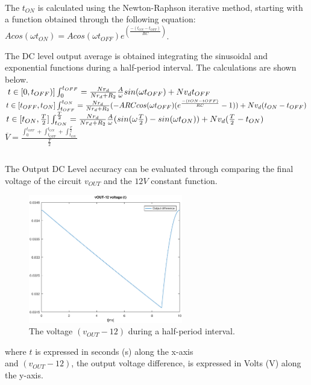 \paragraph{}
The $t_{ON}$ is calculated using the Newton-Raphson iterative method, starting with a function obtained through the following equation: $Acos(\omega t_{ON})=Acos(\omega t_{OFF})e^(\frac{-(t_{ON}-t_{OFF})}{RC})$.

The DC level output average is obtained integrating the sinusoidal and exponential functions during a half-period interval. The calculations are shown below.\\

$t\in[0,t_{OFF})]\\
\int_{0}^{t_{OFF}}=\frac{N r_d}{N r_d + R_2}\frac{A}{\omega}sin(\omega t_{OFF})+N v_d t_{OFF}\\$\\

$t\in[t_{OFF},t_{ON}]\\
\int_{t_{OFF}}^{t_{ON}}=\frac{N r_d}{N r_d + R_2}(-A R C cos(\omega t_{OFF})(e^{\frac{-({tON}-{tOFF})}{RC}}-1))+N v_d (t_{ON} - t_{OFF})\\$\\

$t\in[t_{ON},\frac{T}{2}]\\
\int_{t_{ON}}^{\frac{T}{2}}=\frac{N r_d}{N r_d + R_2}\frac{A}{\omega}(sin(\omega \frac{T}{2})-sin(\omega t_{ON}))+N v_d (\frac{T}{2}-t_{ON})\\$\\

$\overline{V}=\frac{\int_{0}^{t_{OFF}}+\int_{t_{OFF}}^{t_{ON}}+\int_{t_{ON}}^{\frac{T}{2}}}{\frac{T}{2}}$

\begin{center}
   \begin{tabular}{|c||c|}
      \hline
        
   \end{tabular}
 \end{center}

The Output DC Level accuracy can be evaluated through comparing the final voltage of the circuit $v_{OUT}$ and the $12 V$ constant function. 

\begin{figure}[H] \centering
\includegraphics[width=0.6\textwidth]{outputdiff.eps}
\caption{The voltage $(v_{OUT}-12)$ during a half-period interval.}
\label{fig:outputdiff}
\end{figure}

where $t$ is expressed in seconds (s) along the x-axis\\
and $(v_{OUT}-12)$, the output voltage difference, is expressed in Volts (V) along the y-axis.
